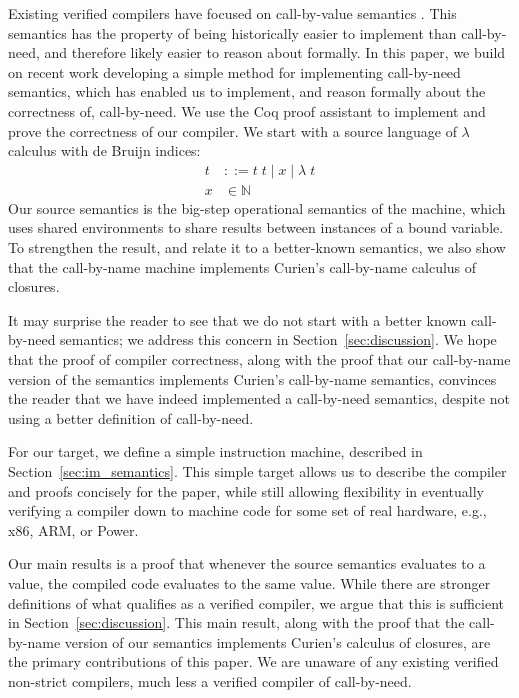 Existing verified compilers have focused on call-by-value semantics
\cite{chlipala2007certified, leroy2012compcert, cakeml14}. This semantics has
the property of being historically easier to implement than call-by-need, and
therefore likely easier to reason about formally. In this paper, we build on
recent work developing a simple method for implementing call-by-need semantics,
which has enabled us to implement, and reason formally about the correctness of,
call-by-need. We use the Coq proof assistant \cite{barras1997coq} to implement
and prove the correctness of our compiler. We start with a source language of
$\lambda$ calculus with de Bruijn indices:
\begin{align*}
 t &::= t \; t \; | \; x \; | \;  \lambda \; t \\
 x &\in \mathbb{N}
\end{align*}
Our source semantics is the big-step operational semantics of the \ce 
machine, which uses shared environments to share results between instances of a
bound variable. To strengthen the result, and relate it to a better-known
semantics, we also show that the call-by-name \ce machine implements
Curien's call-by-name calculus of closures. 

It may surprise the reader to see that we do not start with a better known
call-by-need semantics; we address this concern in
Section~\ref{sec:discussion}.  We hope that the proof of compiler correctness,
along with the proof that our call-by-name version of the semantics implements
Curien's call-by-name semantics, convinces the reader that we have indeed
implemented a call-by-need semantics, despite not using a better definition of
call-by-need. 

For our target, we define a simple instruction machine, described in
Section~\ref{sec:im_semantics}. This simple target allows us to describe the
compiler and proofs concisely for the paper, while still allowing
flexibility in eventually verifying a compiler down to machine code for some
set of real hardware, e.g., x86, ARM, or Power. 

Our main results is a proof that whenever the source semantics evaluates to a
value, the compiled code evaluates to the same value. While there are stronger
definitions of what qualifies as a verified compiler, we argue that this is
sufficient in Section~\ref{sec:discussion}. This main result, along with the
proof that the call-by-name version of our semantics implements Curien's
calculus of closures, are the primary contributions of this paper. We are
unaware of any existing verified non-strict compilers, much less a verified
compiler of call-by-need. 

